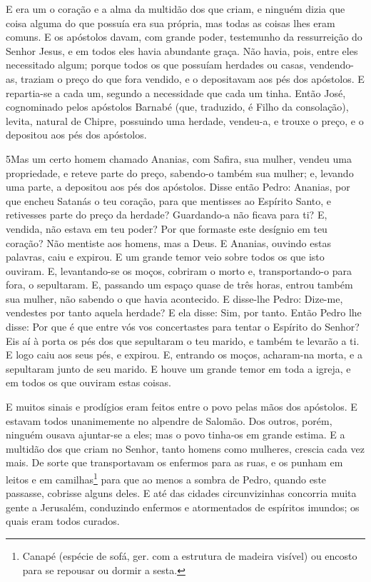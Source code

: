 E era um o coração e a alma da multidão dos que criam, e ninguém
dizia que coisa alguma do que possuía era sua própria, mas todas as
coisas lhes eram comuns. E os apóstolos davam, com grande
poder, testemunho da ressurreição do Senhor Jesus, e em todos eles
havia abundante graça. Não havia, pois, entre eles
necessitado algum; porque todos os que possuíam herdades ou casas,
vendendo-as, traziam o preço do que fora vendido, e o depositavam
aos pés dos apóstolos. E repartia-se a cada um, segundo a
necessidade que cada um tinha. Então José, cognominado pelos
apóstolos Barnabé (que, traduzido, é Filho da consolação), levita,
natural de Chipre, possuindo uma herdade, vendeu-a, e trouxe
o preço, e o depositou aos pés dos apóstolos.

\medskip

\lettrine{5} Mas um certo homem chamado Ananias, com Safira,
sua mulher, vendeu uma propriedade, e reteve parte do preço,
sabendo-o também sua mulher; e, levando uma parte, a depositou aos
pés dos apóstolos. Disse então Pedro: Ananias, por que encheu
Satanás o teu coração, para que mentisses ao Espírito Santo, e
retivesses parte do preço da herdade? Guardando-a não ficava
para ti? E, vendida, não estava em teu poder? Por que formaste este
desígnio em teu coração? Não mentiste aos homens, mas a Deus. E
Ananias, ouvindo estas palavras, caiu e expirou. E um grande temor
veio sobre todos os que isto ouviram. E, levantando-se os moços,
cobriram o morto e, transportando-o para fora, o sepultaram. E,
passando um espaço quase de três horas, entrou também sua mulher,
não sabendo o que havia acontecido. E disse-lhe Pedro: Dize-me,
vendestes por tanto aquela herdade? E ela disse: Sim, por tanto.
Então Pedro lhe disse: Por que é que entre vós vos concertastes
para tentar o Espírito do Senhor? Eis aí à porta os pés dos que
sepultaram o teu marido, e também te levarão a ti. E logo
caiu aos seus pés, e expirou. E, entrando os moços, acharam-na
morta, e a sepultaram junto de seu marido. E houve um grande
temor em toda a igreja, e em todos os que ouviram estas coisas.

E muitos sinais e prodígios eram feitos entre o povo pelas mãos
dos apóstolos. E estavam todos unanimemente no alpendre de Salomão.
Dos outros, porém, ninguém ousava ajuntar-se a eles; mas o
povo tinha-os em grande estima. E a multidão dos que criam no
Senhor, tanto homens como mulheres, crescia cada vez mais. De
sorte que transportavam os enfermos para as ruas, e os punham em
leitos e em camilhas\footnote{Canapé (espécie de sofá, ger. com a
estrutura de madeira visível) ou encosto para se repousar ou dormir
a sesta.} para que ao menos a sombra de Pedro, quando este passasse,
cobrisse alguns deles. E até das cidades circunvizinhas
concorria muita gente a Jerusalém, conduzindo enfermos e
atormentados de espíritos imundos; os quais eram todos curados.

